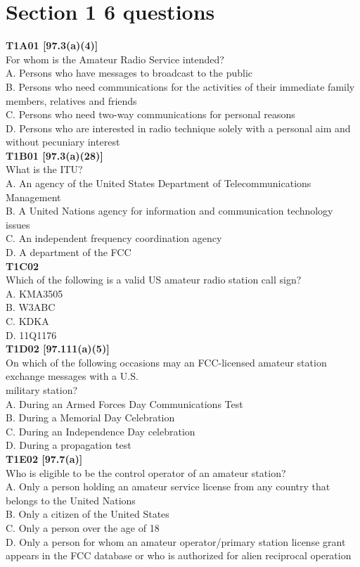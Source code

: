 \documentclass[12pt,letterpaper,twocolumn]{report}
\author{Anthony Odenthal}
\begin{document}
\section{Section 1 6 questions}
\textbf{T1A01 [97.3(a)(4)]}\\
For whom is the Amateur Radio Service intended?\\
A. Persons who have messages to broadcast to the public\\
B. Persons who need communications for the activities of their immediate family members, relatives and friends\\
C. Persons who need two-way communications for personal reasons\\
D. Persons who are interested in radio technique solely with a personal aim and without pecuniary interest\\


\textbf{T1B01 [97.3(a)(28)]}\\
What is the ITU?\\
A. An agency of the United States Department of Telecommunications Management\\
B. A United Nations agency for information and communication technology issues\\
C. An independent frequency coordination agency\\
D. A department of the FCC\\

\textbf{T1C02}\\
Which of the following is a valid US amateur radio station call sign?\\
A. KMA3505\\
B. W3ABC\\
C. KDKA\\
D. 11Q1176\\

\textbf{T1D02 [97.111(a)(5)]}\\
On which of the following occasions may an FCC-licensed amateur station exchange messages with a U.S.\\ military station?\\
A. During an Armed Forces Day Communications Test\\
B. During a Memorial Day Celebration\\
C. During an Independence Day celebration\\
D. During a propagation test\\

\textbf{T1E02 [97.7(a)]}\\
Who is eligible to be the control operator of an amateur station?\\
A. Only a person holding an amateur service license from any country that belongs to the United Nations\\
B. Only a citizen of the United States\\
C. Only a person over the age of 18\\
D. Only a person for whom an amateur operator/primary station license grant appears in the FCC database or who is authorized for alien reciprocal operation\\
\end{document}
